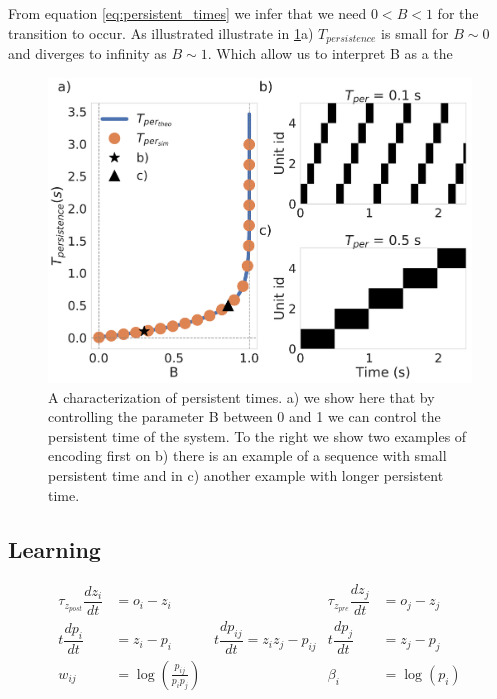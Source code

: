 \documentclass[10pt,a4paper]{article}
\begin{document}
From equation \ref{eq:persistent_times} we infer that we need $0 < B < 1$ for the transition to occur. As illustrated illustrate in \ref{fig:per_time}a) $T_{persistence}$ is small for $B \sim 0$ and diverges to infinity as $B \sim 1$. Which allow us to interpret B as a the


\begin{figure}[H]
\centering
\includegraphics[scale=0.30]{persistent_times.pdf}
\caption{A characterization of persistent times. a) we show here that by controlling the parameter B between 0 and 1 we can control the persistent time of the system. To the right we show two examples of encoding first on b) there is an example of a sequence with small persistent time and  in c) another example with longer persistent time.}
\label{fig:per_time}
\end{figure}

\subsection{Learning}

\begin{align}
\tau_{z_{post}} \dfrac{dz_i}{dt} &= o_i - z_i 
& \tau_{z_{pre}} \dfrac{d z_j}{dt} &= o_j - z_j \label{eq:z_traces} \\
t \dfrac{dp_i}{dt} &= z_i - p_i  
\qquad \quad t\dfrac{dp_{ij}}{dt} = z_i z_j - p_{ij}
&t\dfrac{dp_j}{dt} &= z_j - p_j    \label{eq:p_traces} \\
w_{ij} &= \log \left(\frac{p_{ij}}{p_i p_j} \right) & \beta_i &= \log(p_i) \label{eq:bcpnn} 
\end{align}

\end{document}
